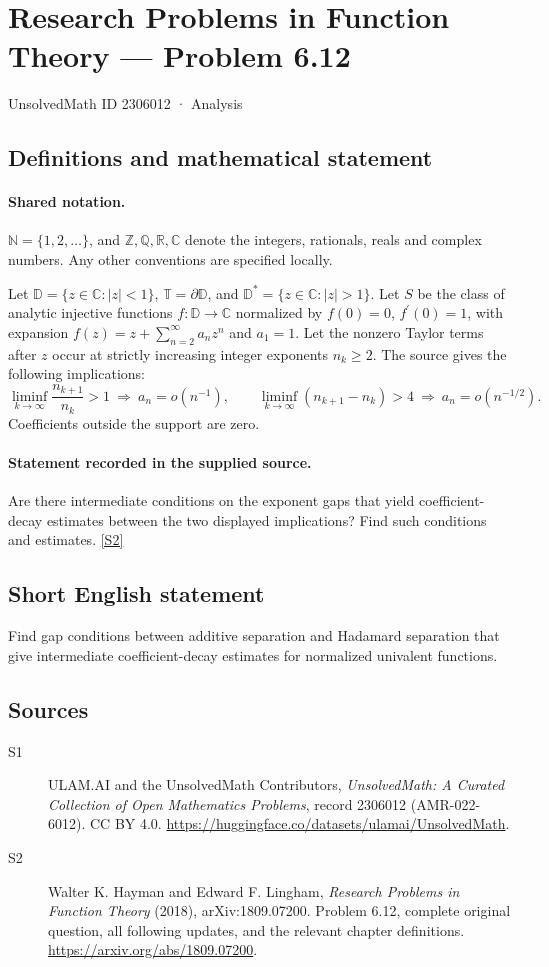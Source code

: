 \documentclass[11pt]{book}
\newcommand{\sref}[2]{\hyperlink{source:#1:#2}{[S#2]}}
\begin{document}
\setcounter{section}{2306011}
\section{Research Problems in Function Theory — Problem 6.12}\label{2306012}
{\small\sffamily UnsolvedMath ID 2306012 · Analysis}
\subsection{Definitions and mathematical statement}

\paragraph{Shared notation.}$\mathbb N=\{1,2,\ldots\}$, and $\mathbb Z,\mathbb Q,\mathbb R,\mathbb C$ denote the integers, rationals, reals and complex numbers. Any other conventions are specified locally.


Let $\mathbb D=\{z\in\mathbb C:|z|<1\}$, $\mathbb T=\partial\mathbb D$, and $\mathbb D^*=\{z\in\mathbb C:|z|>1\}$. Let $S$ be the class of analytic injective functions $f:\mathbb D\to\mathbb C$ normalized by $f(0)=0$, $f^{\prime}(0)=1$, with expansion $f(z)=z+\sum_{n=2}^{\infty}a_nz^n$ and $a_1=1$. Let the nonzero Taylor terms after $z$ occur at strictly increasing integer exponents $n_k\ge2$. The source gives the following implications: \[\liminf_{k\to\infty}\frac{n_{k+1}}{n_k}>1\ \Longrightarrow\ a_n=o(n^{-1}),\qquad \liminf_{k\to\infty}(n_{k+1}-n_k)>4\ \Longrightarrow\ a_n=o(n^{-1/2}).\] Coefficients outside the support are zero.
\paragraph{Statement recorded in the supplied source.}
Are there intermediate conditions on the exponent gaps that yield coefficient-decay estimates between the two displayed implications? Find such conditions and estimates. \sref{2306012}{2}
\subsection{Short English statement}
Find gap conditions between additive separation and Hadamard separation that give intermediate coefficient-decay estimates for normalized univalent functions.
\subsection{Sources}
\begin{description}
\item[\hypertarget{source:2306012:1}{S1}] ULAM.AI and the UnsolvedMath Contributors, \emph{UnsolvedMath: A Curated Collection of Open Mathematics Problems}, record 2306012 (AMR-022-6012). CC BY 4.0. \url{https://huggingface.co/datasets/ulamai/UnsolvedMath}.
\item[\hypertarget{source:2306012:2}{S2}] Walter K. Hayman and Edward F. Lingham, \emph{Research Problems in Function Theory} (2018), arXiv:1809.07200. Problem 6.12, complete original question, all following updates, and the relevant chapter definitions. \url{https://arxiv.org/abs/1809.07200}.
\end{description}
\label{end:2306012}
\end{document}

